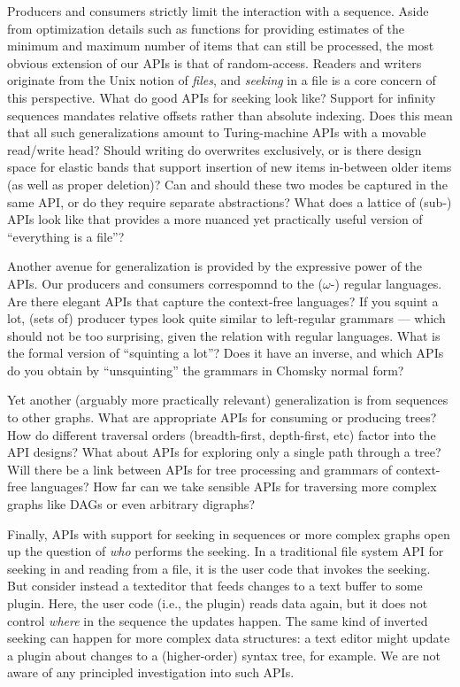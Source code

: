 \documentclass[sigplan,screen,10pt,anonymous,review]{acmart}
\begin{document}
Producers and consumers strictly limit the interaction with a sequence. Aside from optimization details such as functions for providing estimates of the minimum and maximum number of items that can still be processed, the most obvious extension of our APIs is that of random-access. Readers and writers originate from the Unix notion of \textit{files}, and \textit{seeking} in a file is a core concern of this perspective. What do good APIs for seeking look like? Support for infinity sequences mandates relative offsets rather than absolute indexing. Does this mean that all such generalizations amount to Turing-machine APIs with a movable read/write head? Should writing do overwrites exclusively, or is there design space for elastic bands that support insertion of new items in-between older items (as well as proper deletion)? Can and should these two modes be captured in the same API, or do they require separate abstractions? What does a lattice of (sub-) APIs look like that provides a more nuanced yet practically useful version of ``everything is a file''?

Another avenue for generalization is provided by the expressive power of the APIs. Our producers and consumers correspomnd to the ($\omega$-) regular languages. Are there elegant APIs that capture the context-free languages? If you squint a lot, (sets of) producer types look quite similar to left-regular grammars --- which should not be too surprising, given the relation with regular languages. What is the formal version of ``squinting a lot''? Does it have an inverse, and which APIs do you obtain by ``unsquinting'' the grammars in Chomsky normal form?

Yet another (arguably more practically relevant) generalization is from sequences to other graphs. What are appropriate APIs for consuming or producing trees? How do different traversal orders (breadth-first, depth-first, etc) factor into the API designs? What about APIs for exploring only a single path through a tree? Will there be a link between APIs for tree processing and grammars of context-free languages? How far can we take sensible APIs for traversing more complex graphs like DAGs or even arbitrary digraphs?

Finally, APIs with support for seeking in sequences or more complex graphs open up the question of \textit{who} performs the seeking. In a traditional file system API for seeking in and reading from a file, it is the user code that invokes the seeking. But consider instead a texteditor that feeds changes to a text buffer to some plugin. Here, the user code (i.e., the plugin) reads data again, but it does not control \textit{where} in the sequence the updates happen. The same kind of inverted seeking can happen for more complex data structures: a text editor might update a plugin about changes to a (higher-order) syntax tree, for example. We are not aware of any principled investigation into such APIs.
\end{document}
